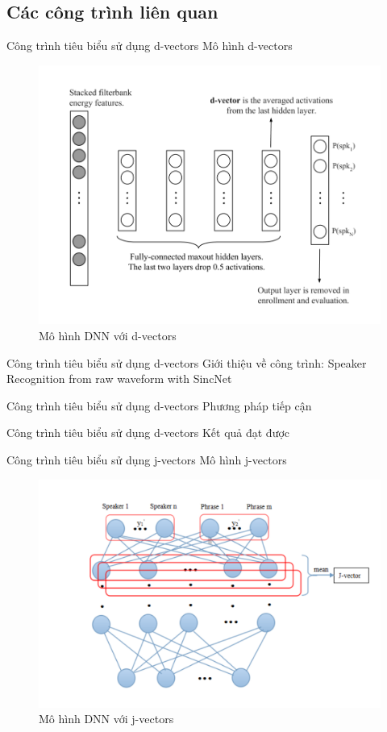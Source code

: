 \documentclass[notheorems, aspectratio=54]{beamer}
\begin{document}
\subsection{Các công trình liên quan}
\begin{frame}{Công trình tiêu biểu sử dụng d-vectors}
	Mô hình d-vectors
	\begin{figure}[H]
		\includegraphics[width=0.7\linewidth]{images/d-vectors.png}
		\caption{Mô hình DNN với d-vectors}
		\label{fig:writing-thesis}
	\end{figure}
\end{frame}
\begin{frame}{Công trình tiêu biểu sử dụng d-vectors}
	Giới thiệu về công trình: Speaker Recognition from raw waveform with SincNet
\end{frame}
\begin{frame}{Công trình tiêu biểu sử dụng d-vectors}
	Phương pháp tiếp cận
\end{frame}
\begin{frame}{Công trình tiêu biểu sử dụng d-vectors}
	Kết quả đạt được
\end{frame}
\begin{frame}{Công trình tiêu biểu sử dụng j-vectors}
	Mô hình j-vectors
	\begin{figure}[H]
		\includegraphics[width=0.7\linewidth]{images/j-vectors.png}
		\caption{Mô hình DNN với j-vectors}
		\label{fig:writing-thesis}
	\end{figure}
\end{frame}
\end{document}
